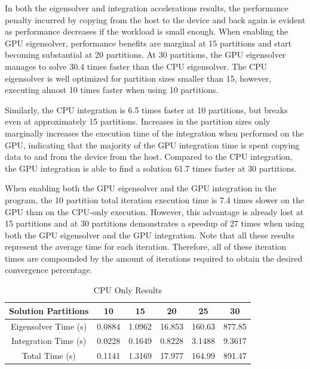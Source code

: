 \documentclass[conference, twoside]{IEEEtran}
\begin{document}
In both the eigensolver and integration accelerations results, the performance penalty incurred by copying from the host to the device and back again is evident as performance decreases if the workload is small enough. When enabling the GPU eigensolver, performance benefits are marginal at 15 partitions and start becoming substantial at 20 partitions. At 30 partitions, the GPU eigensolver manages to solve 30.4 times faster than the CPU eigensolver. The CPU eigensolver is well optimized for partition sizes smaller than 15, however, executing almost 10 times faster when using 10 partitions.

Similarly, the CPU integration is 6.5 times faster at 10 partitions, but breaks even at approximately 15 partitions. Increases in the partition sizes only marginally increases the execution time of the integration when performed on the GPU, indicating that the majority of the GPU integration time is spent copying data to and from the device from the host. Compared to the CPU integration, the GPU integration is able to find a solution 61.7 times faster at 30 partitions.

When enabling both the GPU eigensolver and the GPU integration in the program, the 10 partition total iteration execution time is 7.4 times slower on the GPU than on the CPU-only execution. However, this advantage is already lost at 15 partitions and at 30 partitions demonstrates a speedup of 27 times when using both the GPU eigensolver and the GPU integration. Note that all these results represent the average time for each iteration. Therefore, all of these iteration times are compounded by the amount of iterations required to obtain the desired convergence percentage.

\begin{table}
    \renewcommand{\arraystretch}{1.3} %
    \caption{CPU Only Results}
    \label{cpu-only-results}
    \centering
    \begin{tabular}{c||c|c|c|c|c}
        \hline
        {Solution Partitions} & {10} & {15} & {20} & {25} & {30} \\
        \hline
        \hline
        {Eigensolver Time (s)}              & {0.0884} & {1.0962} & {16.853} & {160.63} & {877.85}\\
        {Integration Time (s)}              & {0.0228} & {0.1649} & {0.8228} & {3.1488} & {9.3617}\\
        {Total Time (s)}                    & {0.1141} & {1.3169} & {17.977} & {164.99} & {891.47}\\
        \hline
    \end{tabular}
\end{table}
\end{document}

